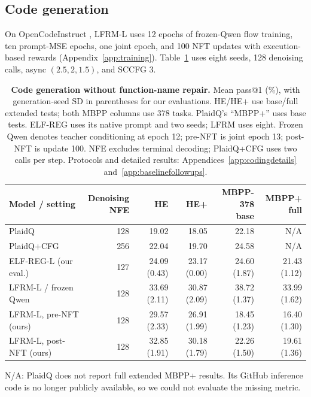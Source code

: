 \documentclass{article}
\newcommand{\rev}[1]{{\color{blue}#1}}
\begin{document}
\subsection{Code generation}
\label{sec:codingresults}

On OpenCodeInstruct \citep{opencodeinstruct}, LFRM-L uses 12 epochs of frozen-Qwen flow training, ten prompt-MSE epochs, one joint epoch, and 100 NFT updates with execution-based rewards (Appendix~\ref{app:training}). Table~\ref{tab:codingcomparison} uses eight seeds, 128 denoising calls, async $(2.5,2,1.5)$, and SCCFG 3.

\begin{table}[!htb]
\centering\small
\setlength{\tabcolsep}{3pt}
\caption{\textbf{Code generation without function-name repair.} Mean pass@1 (\%)\rev{, with generation-seed SD in parentheses for our evaluations}. HE/HE+ use base/full extended tests; both MBPP columns use 378 tasks. PlaidQ's ``MBPP+'' uses base tests. \rev{ELF-REG uses its native prompt and two seeds; LFRM uses eight. Frozen Qwen denotes teacher conditioning at epoch 12; pre-NFT is joint epoch 13; post-NFT is update 100.} NFE excludes terminal decoding; PlaidQ+CFG uses two calls per step. \rev{Protocols and detailed results: Appendices~\ref{app:codingdetails} and~\ref{app:baselinefollowups}.}}
\label{tab:codingcomparison}
\begin{tabular}{@{}lrrrrr@{}}
\toprule
Model / setting & \shortstack{Denoising\\NFE} & HE & HE+ & \shortstack{MBPP-378\\base} & \shortstack{MBPP+\\full} \\
\midrule
PlaidQ \citep{plaidq} & 128 & 19.02 & 18.05 & 22.18 & \rev{N/A}\\
PlaidQ+CFG \citep{plaidq} & 256 & 22.04 & 19.70 & 24.58 & \rev{N/A}\\
\rev{ELF-REG-L (our eval.)} & \rev{127} & \rev{24.09 {\scriptsize (0.43)}} & \rev{23.17 {\scriptsize (0.00)}} & \rev{24.60 {\scriptsize (1.87)}} & \rev{21.43 {\scriptsize (1.12)}}\\
\midrule
LFRM-L / frozen Qwen & 128 & 33.69 \rev{\scriptsize (2.11)} & 30.87 \rev{\scriptsize (2.09)} & 38.72 \rev{\scriptsize (1.37)} & 33.99 \rev{\scriptsize (1.62)}\\
\midrule
LFRM-L, pre-NFT (ours) & 128 & 29.57 \rev{\scriptsize (2.33)} & 26.91 \rev{\scriptsize (1.99)} & 18.45 \rev{\scriptsize (1.23)} & 16.40 \rev{\scriptsize (1.30)}\\
LFRM-L, post-NFT (ours) & 128 & 32.85 \rev{\scriptsize (1.91)} & 30.18 \rev{\scriptsize (1.79)} & 22.26 \rev{\scriptsize (1.50)} & 19.61 \rev{\scriptsize (1.36)}\\
\bottomrule
\end{tabular}
\par\smallskip
\parbox{\linewidth}{\footnotesize \rev{N/A: PlaidQ does not report full extended MBPP+ results. Its GitHub inference code is no longer publicly available, so we could not evaluate the missing metric.}}
\end{table}
\end{document}
